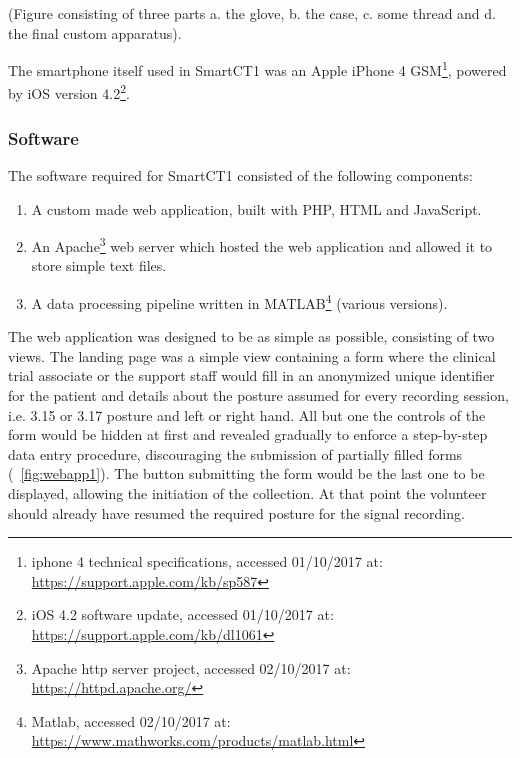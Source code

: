 (\textcolor{BurntOrange}{Figure consisting of three parts a. the glove, b. the case, c. some thread and d. the final custom apparatus}).

The smartphone itself used in \gls{SmartCT1} was an Apple iPhone 4 GSM\footnote{iphone 4 technical specifications, accessed 01/10/2017 at: \url{https://support.apple.com/kb/sp587}}, powered by iOS version 4.2\footnote{iOS 4.2 software update, accessed 01/10/2017 at: \url{https://support.apple.com/kb/dl1061}}. 







\subsubsection{Software}
\label{subsubsec:smartCT1Software}
The software required for \gls{SmartCT1} consisted of the following components:

\begin{enumerate}
\item A custom made web application, built with PHP, HTML and JavaScript.
\item An Apache\footnote{Apache http server project, accessed 02/10/2017 at: \url{https://httpd.apache.org/}} web server which hosted the web application and allowed it to store simple text files.
\item A data processing pipeline written in MATLAB\footnote{Matlab, accessed 02/10/2017 at: \url{https://www.mathworks.com/products/matlab.html}} (various versions).
\end{enumerate}

The web application was designed to be as simple as possible, consisting of two views. The landing page was a simple view containing a form where the clinical trial associate or the support staff would fill in an anonymized unique identifier for the patient and details about the posture assumed for every recording session, i.e. 3.15 or 3.17 posture and left or right hand. All but one the controls of the form would be hidden at first and revealed gradually to enforce a step-by-step data entry procedure, discouraging the submission of partially filled forms (~\ref{fig:webapp1}). The button submitting the form would be the last one to be displayed, allowing the initiation of the collection. At that point the volunteer should already have resumed the required posture for the signal recording. 

